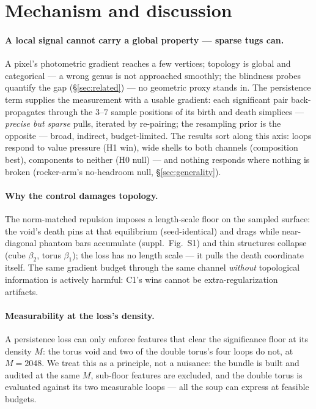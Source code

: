 \section{Mechanism and discussion}
\label{sec:discussion}


\paragraph{A local signal cannot carry a global property --- sparse
tugs can.} A pixel's photometric gradient reaches a few vertices;
topology is global and categorical --- a wrong genus is not approached
smoothly; the blindness probes quantify the gap (\S\ref{sec:related})
--- no geometric proxy stands in. The persistence
term supplies the measurement with a usable gradient: each significant
pair back-propagates through the $3$--$7$ sample positions of its birth
and death simplices --- \emph{precise but sparse} pulls, iterated by re-pairing; the
resampling prior is the opposite --- broad, indirect, budget-limited. The results sort along this axis: loops respond to value
pressure (H1 win), wide shells to both channels (composition best),
components to neither (H0 null) --- and nothing responds where nothing
is broken (rocker-arm's no-headroom null, \S\ref{sec:generality}).

\paragraph{Why the control damages topology.} The norm-matched repulsion
imposes a length-scale floor on the sampled surface: the void's death
pins at that equilibrium (seed-identical) and drags while
near-diagonal phantom bars accumulate (suppl.\ Fig.~S1) and thin
structures collapse (cube $\beta_2$, torus $\beta_1$); the loss has no
length scale --- it pulls the death coordinate itself. The
same gradient budget through the same channel \emph{without}
topological information is actively harmful: C1's wins cannot be
extra-regularization artifacts.

\paragraph{Measurability at the loss's density.} A persistence loss can
only enforce features that clear the significance floor at its density
$M$: the torus void and two of the double torus's four loops do not, at
$M{=}2048$. We treat this as a principle, not a nuisance: the bundle is
built and audited at the same $M$, sub-floor features are excluded,
and the double torus is evaluated against its two measurable loops ---
all the soup can express at feasible budgets.


